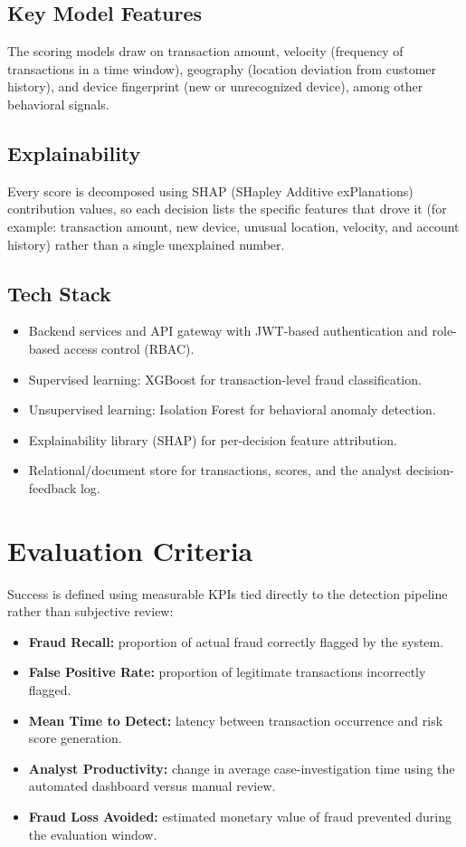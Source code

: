 \documentclass[11pt,letterpaper]{article}
\begin{document}
\subsection{Key Model Features}
The scoring models draw on transaction amount, velocity (frequency of transactions in a time window), geography (location deviation from customer history), and device fingerprint (new or unrecognized device), among other behavioral signals.

\subsection{Explainability}
Every score is decomposed using SHAP (SHapley Additive exPlanations) contribution values, so each decision lists the specific features that drove it (for example: transaction amount, new device, unusual location, velocity, and account history) rather than a single unexplained number.

\subsection{Tech Stack}
\begin{itemize}
    \item Backend services and API gateway with JWT-based authentication and role-based access control (RBAC).
    \item Supervised learning: XGBoost for transaction-level fraud classification.
    \item Unsupervised learning: Isolation Forest for behavioral anomaly detection.
    \item Explainability library (SHAP) for per-decision feature attribution.
    \item Relational/document store for transactions, scores, and the analyst decision-feedback log.
\end{itemize}

\newpage
\section{Evaluation Criteria}
Success is defined using measurable KPIs tied directly to the detection pipeline rather than subjective review:
\begin{itemize}
    \item \textbf{Fraud Recall:} proportion of actual fraud correctly flagged by the system.
    \item \textbf{False Positive Rate:} proportion of legitimate transactions incorrectly flagged.
    \item \textbf{Mean Time to Detect:} latency between transaction occurrence and risk score generation.
    \item \textbf{Analyst Productivity:} change in average case-investigation time using the automated dashboard versus manual review.
    \item \textbf{Fraud Loss Avoided:} estimated monetary value of fraud prevented during the evaluation window.
\end{itemize}
\end{document}
